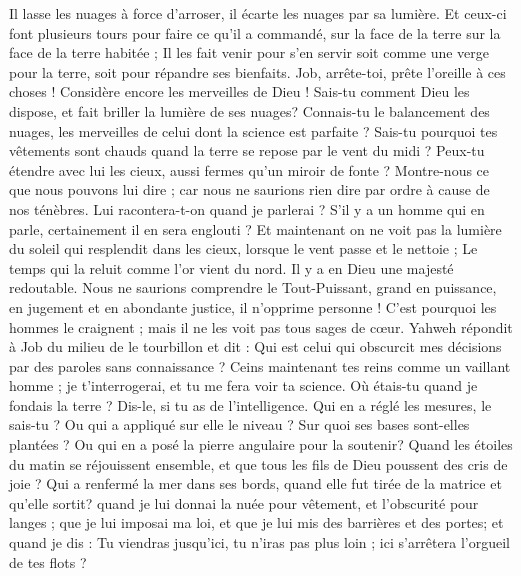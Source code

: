 \begin{multicols}{2}
Il lasse les nuages à force d'arroser, il écarte les nuages par sa lumière.
Et ceux-ci font plusieurs tours pour faire ce qu'il a commandé, sur la face de la terre sur la face de la terre habitée ;
Il les fait venir pour s'en servir soit comme une verge pour la terre, soit pour répandre ses bienfaits.
Job, arrête-toi, prête l'oreille à ces choses ! Considère encore les merveilles de Dieu !
Sais-tu comment Dieu les dispose, et fait briller la lumière de ses nuages?
Connais-tu le balancement des nuages, les merveilles de celui dont la science est parfaite ?
Sais-tu pourquoi tes vêtements sont chauds quand la terre se repose par le vent du midi ?
Peux-tu étendre avec lui les cieux, aussi fermes qu'un miroir de fonte ?
Montre-nous ce que nous pouvons lui dire ; car nous ne saurions rien dire par ordre à cause de nos ténèbres. 
Lui racontera-t-on quand je parlerai ? S'il y a un homme qui en parle, certainement il en sera englouti ?
Et maintenant on ne voit pas la lumière du soleil qui resplendit dans les cieux, lorsque le vent passe et le nettoie ;
Le temps qui la reluit comme l'or vient du nord. Il y a en Dieu une majesté redoutable.
Nous ne saurions comprendre le Tout-Puissant, grand en puissance, en jugement et en abondante justice, il n'opprime personne !
C'est pourquoi les hommes le craignent ; mais il ne les voit pas tous sages de cœur.
\VerseOne{}Yahweh répondit à Job du milieu de le tourbillon et dit :
Qui est celui qui obscurcit mes décisions par des paroles sans connaissance ?
Ceins maintenant tes reins comme un vaillant homme ; je t'interrogerai, et tu me fera voir ta science.
Où étais-tu quand je fondais la terre ? Dis-le, si tu as de l'intelligence.
Qui en a réglé les mesures, le sais-tu ? Ou qui a appliqué sur elle le niveau ?
Sur quoi ses bases sont-elles plantées ? Ou qui en a posé la pierre angulaire pour la soutenir?
Quand les étoiles du matin se réjouissent ensemble, et que tous les fils de Dieu poussent des cris de joie  ?
Qui a renfermé la mer dans ses bords, quand elle fut tirée de la matrice et qu'elle sortit? 
quand je lui donnai la nuée pour vêtement, et l'obscurité pour langes ;
que je lui imposai ma loi, et que je lui mis des barrières et des portes;
 et quand je dis : Tu viendras jusqu'ici, tu n'iras pas plus loin ; ici s'arrêtera l'orgueil de tes flots ?

\end{multicols}
